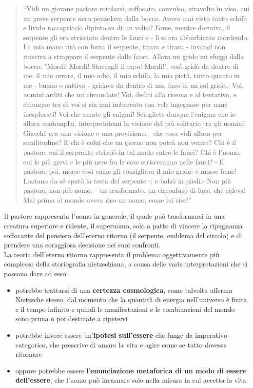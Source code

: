 \documentclass[10pt]{report}
\begin{document}
		\begin{quotation}
			``Vidi un giovane pastore rotolarsi, soffocato, convulso, stravolto in viso, cui un greve serpente nero penzolava dalla bocca.
			Avevo mai visto tanto schifo e livido raccapriccio dipinto su di un volto? Forse, mentre dormiva, il serpente gli era strisciato dentro le fauci e - lì si era abbarbicato mordendo.
			La mia mano tirò con forza il serpente, tirava e tirava - invano! non riusciva a strappare il serpente dalle fauci. Allora un grido mi sfuggì dalla bocca: "Mordi! Mordi! Staccagli il capo! Mordi!", così gridò da dentro di me: il mio orrore, il mio odio, il mio schifo, la mia pietà, tutto quanto in me - buono o cattivo - gridava da dentro di me, fuso in un sol grido.-
			Voi, uomini arditi che mi circondate! Voi, dediti alla ricerca e al tentativo, e chiunque tra di voi si sia mai imbarcato con vele ingegnose per mari inesplorati! Voi che amate gli enigmi!
			Sciogliete dunque l'enigma che io allora contemplai, interpretatemi la visione del più solitario tra gli uomini!
			Giacché era una visione e una previsione: - che cosa vidi allora per similitudine? E chi è colui che un giorno non potrà non venire?
			Chi è il pastore, cui il serprente strisciò in tal modo entro le fauci? Chi è l'uomo, cui le più grevi e le più nere fra le cose strisceranno nelle fauci?
			- Il pastore, poi, morse così come gli consigliava il mio grido: e morse bene! Lontano da sé sputò la testa del serpente -; e balzò in piedi.-
			Non più pastore, non più uomo, - un trasformato, un circonfuso di luce, che rideva! Mai prima al mondo aveva riso un uomo, come lui rise!''
		\end{quotation}
		Il pastore rappresenta l'uomo in generale, il quale può trasformarsi in una creatura superiore e ridente, il superuomo, solo a patto di vincere la ripugnanza soffocante del pensiero dell'eterno ritorno (il serpente, emblema del circolo) e di prendere una coraggiosa decisione nei suoi confronti.\\
		La teoria dell'eterno ritorno rappresenta il problema oggettivamente più complesso della storiografia nietzschiana, a causa delle varie interpretazioni che si possono dare ad esso:
		\begin{itemize}
			\item potrebbe trattarsi di una \textbf{certezza cosmologica}, come talvolta afferma Nietzsche stesso, dal momento che la quantità di energia nell'universo è finita e il tempo infinito e quindi le manifestazioni e le combinazioni del mondo sono prima o poi destinate a ripetersi
			\item potrebbe invece essere un'\textbf{ipotesi sull'essere} che funge da imperativo categorico, che prescrive di amare la vita e agire come se tutto dovesse ritornare
			\item oppure potrebbe essere l'\textbf{enunciazione metaforica di un modo di essere dell'essere}, che l'uomo può incarnare solo nella misura in cui accetta la vita.
		\end{itemize}
\end{document}
